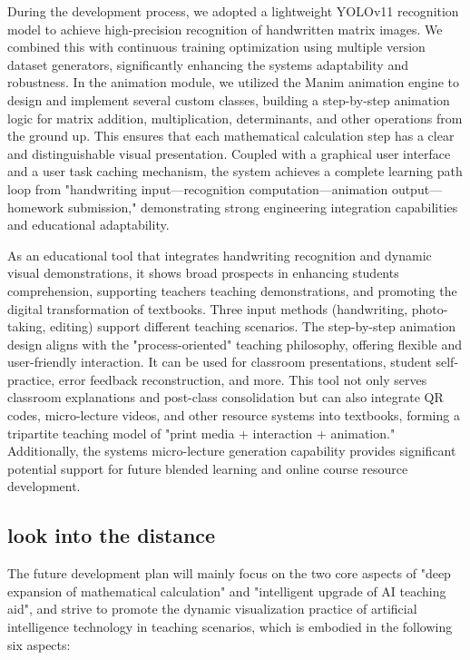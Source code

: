 \documentclass[
]{article}
\begin{document}
During the development process, we adopted a lightweight YOLOv11
recognition model to achieve high-precision recognition of handwritten
matrix images. We combined this with continuous training optimization
using multiple version dataset generators, significantly enhancing the
system\textquotesingle s adaptability and robustness. In the animation
module, we utilized the Manim animation engine to design and implement
several custom classes, building a step-by-step animation logic for
matrix addition, multiplication, determinants, and other operations from
the ground up. This ensures that each mathematical calculation step has
a clear and distinguishable visual presentation. Coupled with a
graphical user interface and a user task caching mechanism, the system
achieves a complete learning path loop from "handwriting
input---recognition computation---animation output---homework
submission," demonstrating strong engineering integration capabilities
and educational adaptability.

As an educational tool that integrates handwriting recognition and
dynamic visual demonstrations, it shows broad prospects in enhancing
students \textquotesingle comprehension, supporting
teachers\textquotesingle{} teaching demonstrations, and promoting the
digital transformation of textbooks. Three input methods (handwriting,
photo-taking, editing) support different teaching scenarios. The
step-by-step animation design aligns with the "process-oriented"
teaching philosophy, offering flexible and user-friendly interaction. It
can be used for classroom presentations, student self-practice, error
feedback reconstruction, and more. This tool not only serves classroom
explanations and post-class consolidation but can also integrate QR
codes, micro-lecture videos, and other resource systems into textbooks,
forming a tripartite teaching model of "print media + interaction +
animation." Additionally, the system\textquotesingle s micro-lecture
generation capability provides significant potential support for future
blended learning and online course resource development.

\subsection{look into the distance}\label{look-into-the-distance}

The future development plan will mainly focus on the two core aspects of
"deep expansion of mathematical calculation" and "intelligent upgrade of
AI teaching aid", and strive to promote the dynamic visualization
practice of artificial intelligence technology in teaching scenarios,
which is embodied in the following six aspects:
\end{document}
